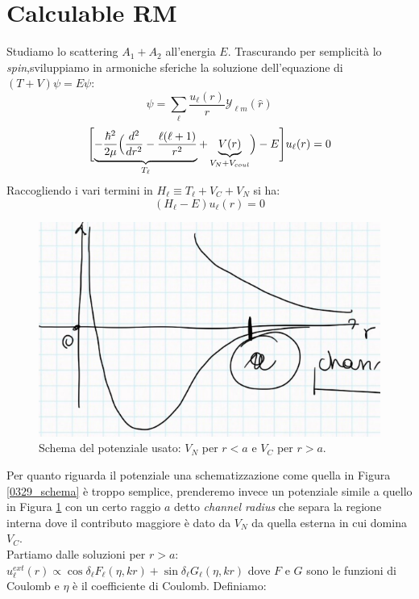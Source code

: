 \section{Calculable RM}
Studiamo lo scattering $A_1 + A_2$ all'energia $E$. Trascurando per semplicità lo \textit{spin},sviluppiamo in armoniche sferiche la soluzione dell'equazione di \Sch{} $(T+V)\psi = E\psi$:
$$\psi = \sum_\ell \frac{u_\ell (r)}{r}\mathcal{Y}_{\ell m}(\hat{r})$$
$$\Biggl [ \underbrace{-\frac{\hbar^2}{2\mu}\Bigl (\frac{d^2}{dr^2} -\frac{\ell(\ell+1)}{r^2}}_{T_\ell}+\underbrace{V(r)}_{V_N + V_{coul}}\Bigr )-E \Biggr ] u_\ell(r) =0$$
Raccogliendo i vari termini in $H_\ell\equiv T_\ell + V_C + V_N$ si ha:
\begin{equation}\label{0412_sch}
	(H_\ell - E) u_\ell (r) =0
\end{equation}
\begin{figure}[h]
	\centering
	\includegraphics[scale=0.5]{Immagini/0412_potschem.png}
	\caption{Schema del potenziale usato: $V_N$ per $r<a$ e $V_C$ per $r>a$.}
	\label{0412_pot}
\end{figure}
\noindent Per quanto riguarda il potenziale una schematizzazione come quella in Figura \ref{0329_schema} è troppo semplice, prenderemo invece un potenziale simile a quello in Figura \ref{0412_pot} con un certo raggio $a$ detto \textit{channel radius} che separa la regione interna dove il contributo maggiore è dato da $V_N$ da quella esterna in cui domina $V_C$.\\ 
Partiamo dalle soluzioni per $r>a$:
$u_\ell^{ext} (r) \propto \cos{\delta_\ell} F_\ell (\eta, kr) + \sin{\delta_\ell}G_\ell (\eta,kr)$
dove $F$ e $G$ sono le funzioni di Coulomb e $\eta$ è il coefficiente di Coulomb. Definiamo:
